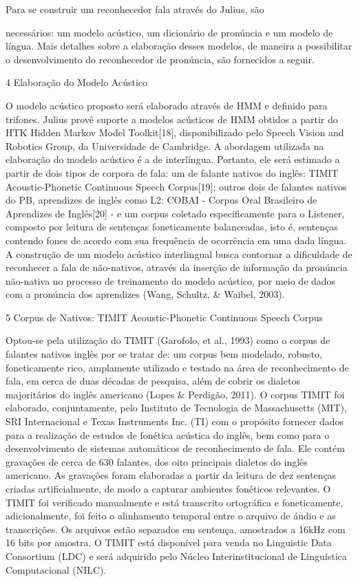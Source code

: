   Para  se  construir  um  reconhecedor  fala  atrav\'es  do  Julius,  s\~ao

necess\'arios: um modelo ac\'ustico, um dicion\'ario de pron\'uncia e um modelo
de l\'ingua. Mais detalhes sobre a elabora\c{c}\~ao desses modelos, de maneira a
possibilitar o desenvolvimento do reconhecedor de pron\'uncia, s\~ao
fornecidos a seguir.

4 Elabora\c{c}\~ao do Modelo Ac\'ustico

O modelo ac\'ustico proposto ser\'a elaborado atrav\'es de HMM e definido para
trifones. Julius prov\^e suporte a modelos ac\'usticos de HMM obtidos a
partir do HTK Hidden Markov Model Toolkit{[}18{]}, disponibilizado pelo
Speech Vision and Robotics Group, da Universidade de Cambridge. A
abordagem utilizada na elabora\c{c}\~ao do modelo ac\'ustico \'e a de interl\'ingua.
Portanto, ele ser\'a estimado a partir de dois tipos de corpora de fala:
um de falante nativos do ingl\^es: TIMIT Acoustic-Phonetic Continuous
Speech Corpus{[}19{]}; outros dois de falantes nativos do PB, aprendizes
de ingl\^es como L2: COBAI - Corpus Oral Brasileiro de Aprendizes de
Ingl\^es{[}20{]} - e um corpus coletado especificamente para o Listener,
composto por leitura de senten\c{c}as foneticamente balanceadas, isto \'e,
senten\c{c}as contendo fones de acordo com sua frequ\^encia de ocorr\^encia em
uma dada l\'ingua. A constru\c{c}\~ao de um modelo ac\'ustico interlingual busca
contornar a dificuldade de reconhecer a fala de n\~ao-nativos, atrav\'es da
inser\c{c}\~ao de informa\c{c}\~ao da pron\'uncia n\~ao-nativa no processo de
treinamento do modelo ac\'ustico, por meio de dados com a pron\'uncia dos
aprendizes (Wang, Schultz, \& Waibel, 2003).

5 Corpus de Nativos: TIMIT Acoustic-Phonetic Continuous Speech Corpus

Optou-se pela utiliza\c{c}\~ao do TIMIT (Garofolo, et al., 1993) como o corpus
de falantes nativos ingl\^es por se tratar de: um corpus bem modelado,
robusto, foneticamente rico, amplamente utilizado e testado na \'area de
reconhecimento de fala, em cerca de duas d\'ecadas de pesquisa, al\'em de
cobrir os dialetos majorit\'arios do ingl\^es americano (Lopes \& Perdig\~ao,
2011). O corpus TIMIT foi elaborado, conjuntamente, pelo Instituto de
Tecnologia de Massachusetts (MIT), SRI Internacional e Texas Instruments
Inc. (TI) com o prop\'osito fornecer dados para a realiza\c{c}\~ao de estudos de
fon\'etica ac\'ustica do ingl\^es, bem como para o desenvolvimento de sistemas
autom\'aticos de reconhecimento de fala. Ele cont\'em grava\c{c}\~oes de cerca de
630 falantes, dos oito principais dialetos do ingl\^es americano. As
grava\c{c}\~oes foram elaboradas a partir da leitura de dez senten\c{c}as criadas
artificialmente, de modo a capturar ambientes fon\'eticos relevantes. O
TIMIT foi verificado manualmente e est\'a transcrito ortogr\'afica e
foneticamente, adicionalmente, foi feito o alinhamento temporal entre o
arquivo de \'audio e as transcri\c{c}\~oes. Os arquivos est\~ao separados em
senten\c{c}a, amostrados a 16kHz com 16 bits por amostra. O TIMIT est\'a
dispon\'ivel para venda no Linguistic Data Consortium (LDC) e ser\'a
adquirido pelo N\'ucleo Interinstitucional de Lingu\'istica Computacional
(NILC).

